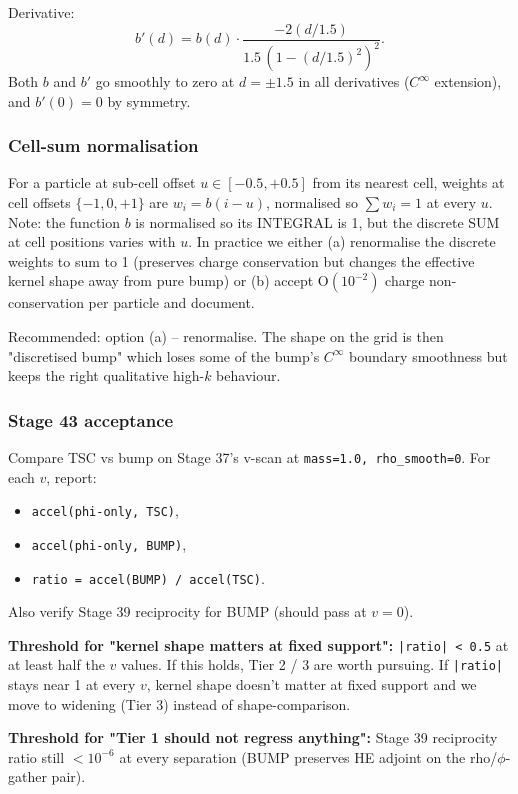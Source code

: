 \documentclass[11pt,a4paper]{article}
\begin{document}
Derivative:
$$
b'(d) = b(d) \cdot \frac{-2 (d/1.5)}{1.5\,(1-(d/1.5)^2)^2}.
$$
Both $b$ and $b'$ go smoothly to zero at $d = \pm 1.5$ in all
derivatives ($C^\infty$ extension), and $b'(0) = 0$ by symmetry.

\subsubsection*{Cell-sum normalisation}

For a particle at sub-cell offset $u \in [-0.5, +0.5]$ from its
nearest cell, weights at cell offsets $\{-1, 0, +1\}$ are
$w_i = b(i - u)$, normalised so $\sum w_i = 1$ at every $u$.  Note:
the function $b$ is normalised so its INTEGRAL is 1, but the
discrete SUM at cell positions varies with $u$.  In practice we
either (a) renormalise the discrete weights to sum to 1 (preserves
charge conservation but changes the effective kernel shape away
from pure bump) or (b) accept O$(10^{-2})$ charge non-conservation
per particle and document.

Recommended: option (a) -- renormalise.  The shape on the grid is
then "discretised bump" which loses some of the bump's $C^\infty$
boundary smoothness but keeps the right qualitative high-$k$
behaviour.

\subsubsection*{Stage 43 acceptance}

Compare TSC vs bump on Stage 37's v-scan at \texttt{mass=1.0,
rho\_smooth=0}.  For each $v$, report:
\begin{itemize}
  \item \texttt{accel(phi-only, TSC)},
  \item \texttt{accel(phi-only, BUMP)},
  \item \texttt{ratio = accel(BUMP) / accel(TSC)}.
\end{itemize}
Also verify Stage 39 reciprocity for BUMP (should pass at $v=0$).

\textbf{Threshold for "kernel shape matters at fixed support":}
\texttt{|ratio| < 0.5} at at least half the $v$ values.  If this
holds, Tier 2 / 3 are worth pursuing.  If \texttt{|ratio|} stays
near 1 at every $v$, kernel shape doesn't matter at fixed support
and we move to widening (Tier 3) instead of shape-comparison.

\textbf{Threshold for "Tier 1 should not regress anything":}
Stage 39 reciprocity ratio still $< 10^{-6}$ at every separation
(BUMP preserves HE adjoint on the rho/$\phi$-gather pair).
\end{document}
